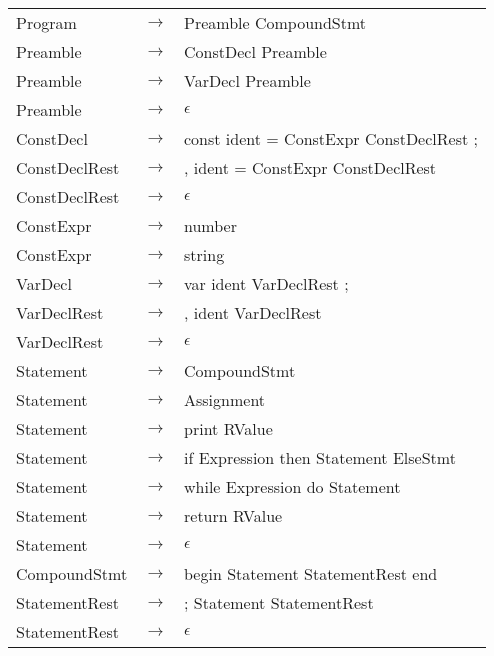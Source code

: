 \documentclass[10pt,a4paper]{article}
\begin{document}
\begin{longtable}{ l c l }
	Program          & $\rightarrow$ & Preamble CompoundStmt \\
	
	Preamble         & $\rightarrow$ & ConstDecl Preamble \\
	Preamble         & $\rightarrow$ & VarDecl Preamble \\
	Preamble         & $\rightarrow$ & $\epsilon$ \\
	
	ConstDecl        & $\rightarrow$ & const ident = ConstExpr ConstDeclRest ; \\
	
	ConstDeclRest    & $\rightarrow$ & , ident = ConstExpr ConstDeclRest \\
	ConstDeclRest    & $\rightarrow$ & $\epsilon$ \\
	
	ConstExpr        & $\rightarrow$ & number \\
	ConstExpr        & $\rightarrow$ & string \\

	VarDecl          & $\rightarrow$ & var ident VarDeclRest ; \\
	
	VarDeclRest      & $\rightarrow$ & , ident VarDeclRest \\
	VarDeclRest      & $\rightarrow$ & $\epsilon$ \\

	Statement        & $\rightarrow$ & CompoundStmt \\
	Statement        & $\rightarrow$ & Assignment \\
	Statement        & $\rightarrow$ & print RValue \\
	Statement        & $\rightarrow$ & if Expression then Statement ElseStmt \\
	Statement        & $\rightarrow$ & while Expression do Statement \\
	Statement        & $\rightarrow$ & return RValue \\ 
	Statement        & $\rightarrow$ & $\epsilon$ \\

	CompoundStmt     & $\rightarrow$ & begin Statement StatementRest end \\
	
	StatementRest    & $\rightarrow$ & ; Statement StatementRest \\
	StatementRest    & $\rightarrow$ & $\epsilon$ \\


\end{longtable}
\end{document}
